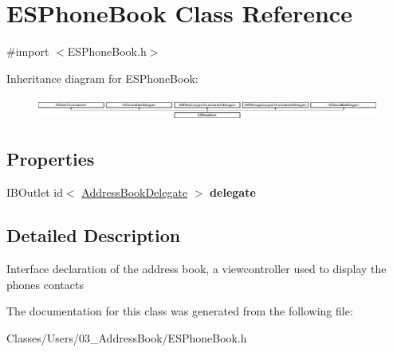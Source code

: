 \hypertarget{interface_e_s_phone_book}{}\section{E\+S\+Phone\+Book Class Reference}
\label{interface_e_s_phone_book}


{\ttfamily \#import $<$E\+S\+Phone\+Book.\+h$>$}

Inheritance diagram for E\+S\+Phone\+Book\+:\begin{figure}[H]
\begin{center}
\leavevmode
\includegraphics[height=0.772414cm]{interface_e_s_phone_book}
\end{center}
\end{figure}
\subsection*{Properties}
\begin{DoxyCompactItemize}
\item 
\hypertarget{interface_e_s_phone_book_ac78a7532a39df303561c22f7a7402571}{}I\+B\+Outlet id$<$ \hyperlink{protocol_address_book_delegate-p}{Address\+Book\+Delegate} $>$ {\bfseries delegate}\label{interface_e_s_phone_book_ac78a7532a39df303561c22f7a7402571}

\end{DoxyCompactItemize}


\subsection{Detailed Description}
Interface declaration of the address book, a viewcontroller used to display the phone\textquotesingle{}s contacts 

The documentation for this class was generated from the following file\+:\begin{DoxyCompactItemize}
\item 
Classes/\+Users/03\+\_\+\+Address\+Book/E\+S\+Phone\+Book.\+h\end{DoxyCompactItemize}
